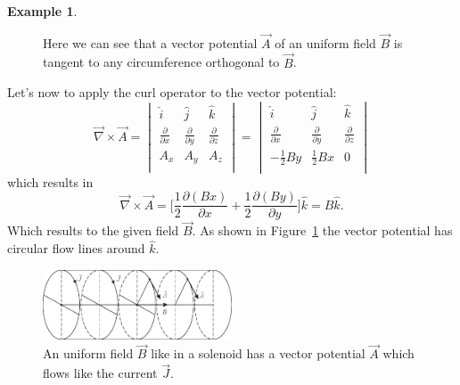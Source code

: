 \documentclass[11pt,a4paper,oneside]{book}
\numberwithin{equation}{section}
\theoremstyle{it}
\theoremstyle{definition}
\newtheorem{example}{Example}[section]
\begin{document}
\begin{example}
\begin{figure}[H]
	\captionsetup{width=0.75\textwidth}		
	\caption{Here we can see that a vector potential $\vec{A}$ of an uniform field $\vec{B}$ is tangent to any circumference orthogonal to $\vec{B}$.}
	\label{morosi_620_2}
\end{figure}
Let's now to apply the curl operator to the vector potential:
\begin{equation}
\vec{\nabla}\times\vec{A}=
\begin{vmatrix}
	\hat{i} & \hat{j} & \hat{k} \\[6pt]
	\frac{\partial}{\partial x} & \frac{\partial}{\partial y} & \frac{\partial}{\partial z} \\[6pt]
	A_x & A_y & A_z \\[6pt]
\end{vmatrix} =
\begin{vmatrix}
	\hat{i} & \hat{j} & \hat{k} \\[6pt]
	\frac{\partial}{\partial x} & \frac{\partial}{\partial y} & \frac{\partial}{\partial z} \\[6pt]
	-\frac{1}{2}By & \frac{1}{2}Bx & 0 \\[6pt]
\end{vmatrix} 
\end{equation}
which results in
\begin{equation}
	\vec{\nabla}\times\vec{A}=\Big[\frac{1}{2}\frac{\partial(Bx)}{\partial x}+\frac{1}{2}\frac{\partial(By)}{\partial y}\Big]\hat{k}=B\hat{k}.
\end{equation}
Which results to the given field $\vec{B}$. As shown in Figure~\ref{morosi_620_2} the vector potential has circular flow lines around $\hat{k}$.
\begin{figure}[H]
	\centering
	\includegraphics[width = 0.5\textwidth, width = 250pt, angle = 0, keepaspectratio]{figures/morosi_620_3.eps}
	\captionsetup{width=0.75\textwidth}		
	\caption{An uniform field $\vec{B}$ like in a solenoid has a vector potential $\vec{A}$ which flows like the current $\vec{J}$.}
	\label{morosi_620_3}
\end{figure}


\end{example}
\end{document}
